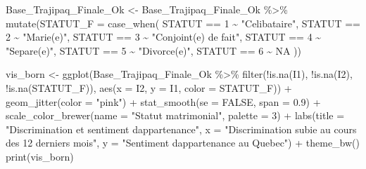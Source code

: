 \documentclass[
]{article}
\newenvironment{Shaded}{\begin{snugshade}}{\end{snugshade}}
\newcommand{\AttributeTok}[1]{\textcolor[rgb]{0.77,0.63,0.00}{#1}}
\newcommand{\ConstantTok}[1]{\textcolor[rgb]{0.00,0.00,0.00}{#1}}
\newcommand{\DecValTok}[1]{\textcolor[rgb]{0.00,0.00,0.81}{#1}}
\newcommand{\FloatTok}[1]{\textcolor[rgb]{0.00,0.00,0.81}{#1}}
\newcommand{\FunctionTok}[1]{\textcolor[rgb]{0.00,0.00,0.00}{#1}}
\newcommand{\NormalTok}[1]{#1}
\newcommand{\OtherTok}[1]{\textcolor[rgb]{0.56,0.35,0.01}{#1}}
\newcommand{\SpecialCharTok}[1]{\textcolor[rgb]{0.00,0.00,0.00}{#1}}
\newcommand{\StringTok}[1]{\textcolor[rgb]{0.31,0.60,0.02}{#1}}
\begin{document}
\begin{Shaded}
\begin{Highlighting}[]
\NormalTok{Base\_Trajipaq\_Finale\_Ok }\OtherTok{\textless{}{-}}
\NormalTok{  Base\_Trajipaq\_Finale\_Ok }\SpecialCharTok{\%\textgreater{}\%}
  \FunctionTok{mutate}\NormalTok{(}\AttributeTok{STATUT\_F =} \FunctionTok{case\_when}\NormalTok{(}
\NormalTok{    STATUT }\SpecialCharTok{==} \DecValTok{1} \SpecialCharTok{\textasciitilde{}} \StringTok{"Celibataire"}\NormalTok{,}
\NormalTok{    STATUT }\SpecialCharTok{==} \DecValTok{2} \SpecialCharTok{\textasciitilde{}} \StringTok{"Marie(e)"}\NormalTok{,}
\NormalTok{    STATUT }\SpecialCharTok{==} \DecValTok{3} \SpecialCharTok{\textasciitilde{}} \StringTok{"Conjoint(e) de fait"}\NormalTok{,}
\NormalTok{    STATUT }\SpecialCharTok{==} \DecValTok{4} \SpecialCharTok{\textasciitilde{}} \StringTok{"Separe(e)"}\NormalTok{,}
\NormalTok{    STATUT }\SpecialCharTok{==} \DecValTok{5} \SpecialCharTok{\textasciitilde{}} \StringTok{"Divorce(e)"}\NormalTok{,}
\NormalTok{    STATUT }\SpecialCharTok{==} \DecValTok{6} \SpecialCharTok{\textasciitilde{}} \ConstantTok{NA}
\NormalTok{  ))}
\end{Highlighting}
\end{Shaded}

\begin{Shaded}
\begin{Highlighting}[]
\NormalTok{vis\_born }\OtherTok{\textless{}{-}} \FunctionTok{ggplot}\NormalTok{(Base\_Trajipaq\_Finale\_Ok }\SpecialCharTok{\%\textgreater{}\%}
                \FunctionTok{filter}\NormalTok{(}\SpecialCharTok{!}\FunctionTok{is.na}\NormalTok{(I1), }\SpecialCharTok{!}\FunctionTok{is.na}\NormalTok{(I2), }\SpecialCharTok{!}\FunctionTok{is.na}\NormalTok{(STATUT\_F)), }\FunctionTok{aes}\NormalTok{(}\AttributeTok{x =}\NormalTok{ I2, }\AttributeTok{y =}\NormalTok{ I1, }\AttributeTok{color =}\NormalTok{ STATUT\_F)) }\SpecialCharTok{+}
  \FunctionTok{geom\_jitter}\NormalTok{(}\AttributeTok{color =} \StringTok{"pink"}\NormalTok{) }\SpecialCharTok{+}
  \FunctionTok{stat\_smooth}\NormalTok{(}\AttributeTok{se =} \ConstantTok{FALSE}\NormalTok{, }\AttributeTok{span =} \FloatTok{0.9}\NormalTok{) }\SpecialCharTok{+}
  \FunctionTok{scale\_color\_brewer}\NormalTok{(}\AttributeTok{name =} \StringTok{"Statut matrimonial"}\NormalTok{, }\AttributeTok{palette =} \DecValTok{3}\NormalTok{) }\SpecialCharTok{+}
  \FunctionTok{labs}\NormalTok{(}\AttributeTok{title =} \StringTok{"Discrimination et sentiment d\textquotesingle{}appartenance"}\NormalTok{, }
       \AttributeTok{x =} \StringTok{"Discrimination subie au cours des 12 derniers mois"}\NormalTok{, }
       \AttributeTok{y =} \StringTok{"Sentiment d\textquotesingle{}appartenance au Quebec"}\NormalTok{) }\SpecialCharTok{+}
  \FunctionTok{theme\_bw}\NormalTok{()}
\FunctionTok{print}\NormalTok{(vis\_born)}
\end{Highlighting}
\end{Shaded}
\end{document}
